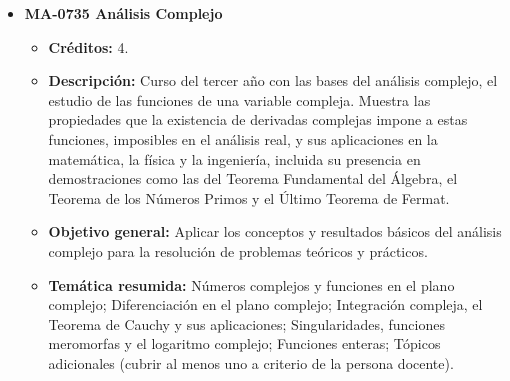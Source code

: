 \begin{itemize}[leftmargin=1.3em, itemsep=10pt, topsep=4pt, label={\color{Azul-UCR}$\blacksquare$}]
\item {\color{Azul-UCR}\textbf{MA-0735 Análisis Complejo}}\par\nopagebreak\smallskip
\begin{itemize}[leftmargin=1.1em, itemsep=3pt, topsep=2pt, parsep=2pt, label={\textendash}]
\item \textbf{Créditos:} 4.
\item \textbf{Descripción:} Curso del tercer año con las bases del análisis complejo, el estudio de las funciones de una variable compleja. Muestra las propiedades que la existencia de derivadas complejas impone a estas funciones, imposibles en el análisis real, y sus aplicaciones en la matemática, la física y la ingeniería, incluida su presencia en demostraciones como las del Teorema Fundamental del Álgebra, el Teorema de los Números Primos y el Último Teorema de Fermat.
\item \textbf{Objetivo general:} Aplicar los conceptos y resultados básicos del análisis complejo para la resolución de problemas teóricos y prácticos.
\item \textbf{Temática resumida:} Números complejos y funciones en el plano complejo; Diferenciación en el plano complejo; Integración compleja, el Teorema de Cauchy y sus aplicaciones; Singularidades, funciones meromorfas y el logaritmo complejo; Funciones enteras; Tópicos adicionales (cubrir al menos uno a criterio de la persona docente).
\end{itemize}


\end{itemize}
